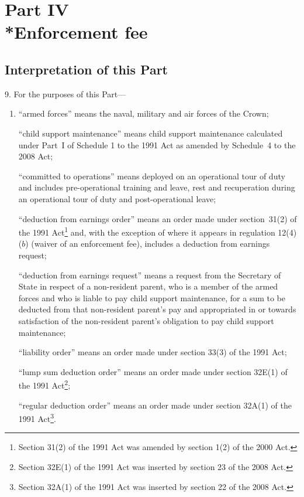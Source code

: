 \documentclass[12pt,a4paper]{article}
\begin{document}
\section[Part IV --- Enforcement fee]{Part IV\\*Enforcement fee}

\renewcommand\parthead{--- Part IV}

\subsection[9. Interpretation of this Part]{Interpretation of this Part}

9.  For the purposes of this Part—
\begin{enumerate}\item[]
“armed forces” means the naval, military and air forces of the Crown;

“child support maintenance” means child support maintenance calculated under Part~I of Schedule 1 to the 1991 Act as amended by Schedule~4 to the 2008 Act;

“committed to operations” means deployed on an operational tour of duty and includes pre-operational training and leave, rest and recuperation during an operational tour of duty and post-operational leave;

“deduction from earnings order” means an order made under section~31(2) of the 1991 Act\footnote{Section 31(2) of the 1991 Act was amended by section 1(2) of the 2000 Act.} and, with the exception of where it appears in regulation 12(4)($b$)  (waiver of an enforcement fee), includes a deduction from earnings request;

“deduction from earnings request” means a request from the Secretary of State in respect of a non-resident parent, who is a member of the armed forces and who is liable to pay child support maintenance, for a sum to be deducted from that non-resident parent’s pay and appropriated in or towards satisfaction of the non-resident parent’s obligation to pay child support maintenance;

“liability order” means an order made under section 33(3) of the 1991 Act;

“lump sum deduction order” means an order made under section 32E(1) of the 1991 Act\footnote{Section 32E(1) of the 1991 Act was inserted by section 23 of the 2008 Act.};

“regular deduction order” means an order made under section 32A(1) of the 1991 Act\footnote{Section 32A(1) of the 1991 Act was inserted by section 22 of the 2008 Act.}.
\end{enumerate}
\end{document}
